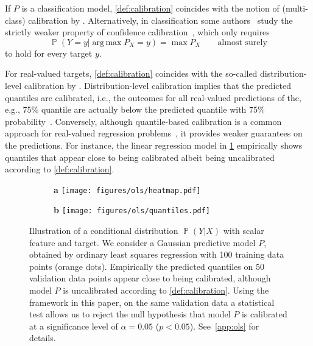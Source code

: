 \documentclass{article}
\DeclareMathOperator{\Prob}{\mathbb{P}}
\DeclareMathOperator{\argmax}{arg\,max}
\begin{document}
If $P$ is a classification model, \cref{def:calibration} coincides
with the notion of (multi-class) calibration by
\citet{Broecker2009,Vaicenavicius2019,Kull2019}. Alternatively, in classification
some authors~\citep{Naeini2015,Guo2017,Kumar2018} study the
strictly weaker property of confidence calibration~\citep{Kull2019},
which only requires
\begin{equation}\label{eq:calibration_confidence}
    \Prob{(Y = y | \argmax {P_X} = y)} = \max P_X \qquad \text{almost surely}
\end{equation}
to hold for every target $y$.

For real-valued targets, \cref{def:calibration} coincides with the
so-called distribution-level calibration by \citet{Song2019}.
Distribution-level calibration
implies that the predicted quantiles are calibrated, i.e., the outcomes for all
real-valued predictions of the, e.g., 75\% quantile are actually below the
predicted quantile with 75\% probability~\citep[Theorem~1]{Song2019}. Conversely,
although quantile-based calibration is a
common approach for real-valued regression
problems~\citep{Ho2005,Fasiolo2020,Rueda2006,Taillardat2016,Kuleshov2018},
it provides weaker guarantees on the predictions. For instance, the
linear regression model in \cref{fig:ols_motivation} empirically shows quantiles that
appear close to being calibrated albeit being uncalibrated according to \cref{def:calibration}.

\begin{figure}[!htb]
    \centering
    \begin{subfigure}[t]{0.62\textwidth}
        \centering
        \textbf{a}
        \texttt{[image: figures/ols/heatmap.pdf]}
    \end{subfigure}%
    \hfill%
    \begin{subfigure}[t]{0.38\textwidth}
        \centering
        \textbf{b}
        \texttt{[image: figures/ols/quantiles.pdf]}
    \end{subfigure}
    \caption{Illustration of a conditional distribution $\Prob(Y|X)$ with scalar
    feature and target. We consider a Gaussian predictive model $P$, obtained by
    ordinary least squares regression with 100 training data points (orange dots).
    Empirically the predicted quantiles on 50 validation data points appear close
    to being calibrated, although model $P$ is uncalibrated according to
    \cref{def:calibration}. Using the framework in this
    paper, on the same validation data a statistical test allows us to reject
    the null hypothesis that model $P$ is calibrated at a significance level of
    $\alpha = 0.05$ ($p < 0.05$). See~\cref{app:ols} for details.}%
    \label{fig:ols_motivation}
\end{figure}
\end{document}
